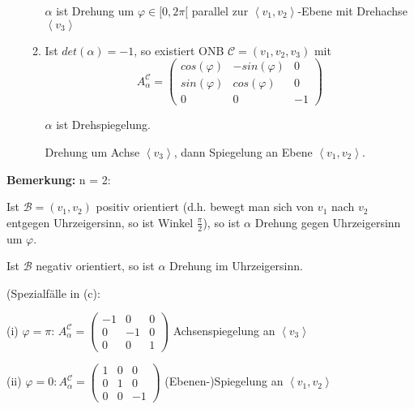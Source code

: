 \documentclass[a4paper, openany]{book}
\begin{document}
\begin{enumerate}[label=(\alph*)]
\begin{enumerate}[label=(\roman*)]
            $\alpha$ ist Drehung um $\varphi \in [0,2 \pi[$ parallel zur $\left \langle v_1, v_2 \right \rangle$-Ebene mit Drehachse $\left \langle v_3 \right \rangle$

            \item Ist $det(\alpha) = -1$, so existiert ONB $\mathcal{C} = (v_1, v_2,v_3)$ mit \[ A_{\alpha}^{\mathcal{C}} = \begin{pmatrix}cos(\varphi) & - sin(\varphi) & 0 \\ sin(\varphi) & cos(\varphi) & 0 \\ 0 & 0 & -1 \end{pmatrix} \]

            $\alpha$ ist Drehspiegelung.

            Drehung um Achse $\left \langle v_3 \right \rangle$, dann Spiegelung an Ebene $\left \langle v_1, v_2 \right \rangle$.
          \end{enumerate}

        \end{enumerate}

        \textbf{Bemerkung:} n = 2:

        Ist $\mathcal{B} = (v_1, v_2)$ positiv orientiert (d.h. bewegt man sich von $v_1$ nach $v_2$ entgegen Uhrzeigersinn, so ist Winkel $\frac{\pi}{2}$), so ist $\alpha$ Drehung gegen Uhrzeigersinn um $\varphi$. 

        \par \medskip

        Ist $\mathcal{B}$ negativ orientiert, so ist $\alpha$ Drehung im Uhrzeigersinn.

        \par \medskip

        (Spezialfälle in (c):

        (i) $\varphi = \pi$: $A_{\alpha}^\mathcal{C} = \begin{pmatrix}-1 & 0 & 0 \\ 0 & -1 & 0 \\ 0 & 0 & 1 \end{pmatrix}$ Achsenspiegelung an $\left \langle v_3 \right \rangle$

        \par \medskip

        (ii) $\varphi = 0 : A_{\alpha}^{\mathcal{C}} = \begin{pmatrix}1 & 0 & 0 \\ 0 & 1 & 0 \\ 0 & 0 & -1 \end{pmatrix}$ (Ebenen-)Spiegelung an $\left \langle v_1, v_2 \right \rangle$
\end{document}
